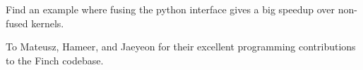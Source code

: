\documentclass[acmsmall]{acmart}
\begin{document}
Find an example where fusing the python interface gives a big speedup over non-fused kernels.


\begin{acks}
    To Mateusz, Hameer, and Jaeyeon for their excellent programming contributions to the Finch codebase.
\end{acks}





\appendix
\end{document}
